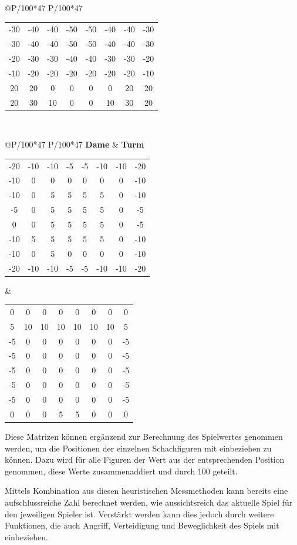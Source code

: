 \begin{table}[htbp]
\begin{tabular}{@{}P{\textwidth/100*47} P{\textwidth/100*47}}
\begin{tabular}{c c c c c c c c}
-30&-40&-40&-50&-50&-40&-40&-30\\
-30&-40&-40&-50&-50&-40&-40&-30\\
-20&-30&-30&-40&-40&-30&-30&-20\\
-10&-20&-20&-20&-20&-20&-20&-10\\
20&20&0&0&0&0&20&20\\
20&30&10&0&0&10&30&20
\end{tabular}
\end{tabular}\\
\begin{tabular}{@{}P{\textwidth/100*47} P{\textwidth/100*47}}
\textbf{Dame} & \textbf{Turm}\\
\begin{tabular}{@{}c c c c c c c c}
-20&-10&-10&-5&-5&-10&-10&-20\\
-10&0&0&0&0&0&0&-10\\
-10&0&5&5&5&5&0&-10\\
-5&0&5&5&5&5&0&-5\\
0&0&5&5&5&5&0&-5\\
-10&5&5&5&5&5&0&-10\\
-10&0&5&0&0&0&0&-10\\
-20&-10&-10&-5&-5&-10&-10&-20
\end{tabular}
&
\begin{tabular}{c c c c c c c c}
0&0&0&0&0&0&0&0\\
5&10&10&10&10&10&10&5\\
-5&0&0&0&0&0&0&-5\\
-5&0&0&0&0&0&0&-5\\
-5&0&0&0&0&0&0&-5\\
-5&0&0&0&0&0&0&-5\\
-5&0&0&0&0&0&0&-5\\
0&0&0&5&5&0&0&0
\end{tabular}
\end{tabular}
\end{table}

Diese Matrizen können ergänzend zur Berechnung des Spielwertes genommen werden, um die Positionen der einzelnen Schachfiguren mit einbeziehen zu können. Dazu wird für alle Figuren der Wert aus der entsprechenden Position genommen, diese Werte zusammenaddiert und durch 100 geteilt.

Mittels Kombination aus diesen heuristischen Messmethoden kann bereits eine aufschlussreiche Zahl berechnet werden, wie aussichtsreich das aktuelle Spiel für den jeweiligen Spieler ist. Verstärkt werden kann dies jedoch durch weitere Funktionen, die auch Angriff, Verteidigung und Beweglichkeit des Spiels mit einbeziehen.

